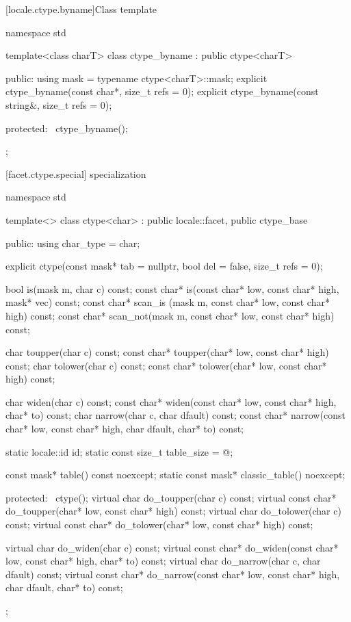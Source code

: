 [locale.ctype.byname]{Class template }

%
\begin{codeblock}
namespace std {
  template<class charT>
    class ctype_byname : public ctype<charT> {
    public:
      using mask = typename ctype<charT>::mask;
      explicit ctype_byname(const char*, size_t refs = 0);
      explicit ctype_byname(const string&, size_t refs = 0);

    protected:
      ~ctype_byname();
    };
}
\end{codeblock}

[facet.ctype.special]{ specialization}

%
\begin{codeblock}
namespace std {
  template<>
    class ctype<char> : public locale::facet, public ctype_base {
    public:
      using char_type = char;

      explicit ctype(const mask* tab = nullptr, bool del = false, size_t refs = 0);

      bool is(mask m, char c) const;
      const char* is(const char* low, const char* high, mask* vec) const;
      const char* scan_is (mask m, const char* low, const char* high) const;
      const char* scan_not(mask m, const char* low, const char* high) const;

      char        toupper(char c) const;
      const char* toupper(char* low, const char* high) const;
      char        tolower(char c) const;
      const char* tolower(char* low, const char* high) const;

      char  widen(char c) const;
      const char* widen(const char* low, const char* high, char* to) const;
      char  narrow(char c, char dfault) const;
      const char* narrow(const char* low, const char* high, char dfault, char* to) const;

      static locale::id id;
      static const size_t table_size = @\impdef@;

      const mask* table() const noexcept;
      static const mask* classic_table() noexcept;

    protected:
      ~ctype();
      virtual char        do_toupper(char c) const;
      virtual const char* do_toupper(char* low, const char* high) const;
      virtual char        do_tolower(char c) const;
      virtual const char* do_tolower(char* low, const char* high) const;

      virtual char        do_widen(char c) const;
      virtual const char* do_widen(const char* low, const char* high, char* to) const;
      virtual char        do_narrow(char c, char dfault) const;
      virtual const char* do_narrow(const char* low, const char* high,
                                    char dfault, char* to) const;
    };
}
\end{codeblock}

